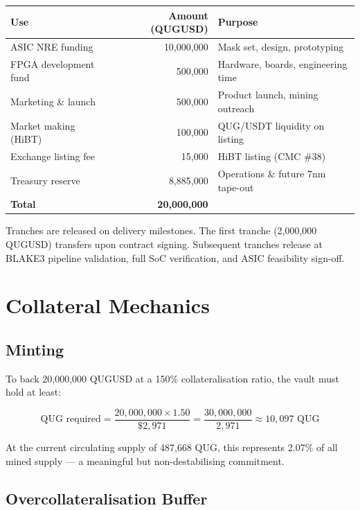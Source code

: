 \documentclass[11pt,a4paper]{article}
\begin{document}
\begin{center}
\begin{tabular}{lrl}
\toprule
\textbf{Use} & \textbf{Amount (QUGUSD)} & \textbf{Purpose} \\
\midrule
ASIC NRE funding          & 10,000,000  & Mask set, design, prototyping \\
FPGA development fund     &    500,000  & Hardware, boards, engineering time \\
Marketing \& launch       &    500,000  & Product launch, mining outreach \\
Market making (HiBT)      &    100,000  & QUG/USDT liquidity on listing \\
Exchange listing fee      &     15,000  & HiBT listing (CMC \#38) \\
Treasury reserve          &  8,885,000  & Operations \& future 7nm tape-out \\
\midrule
\textbf{Total}            & \textbf{20,000,000} & \\
\bottomrule
\end{tabular}
\end{center}

Tranches are released on delivery milestones. The first tranche (2,000,000 QUGUSD)
transfers upon contract signing. Subsequent tranches release at BLAKE3 pipeline
validation, full SoC verification, and ASIC feasibility sign-off.

\section{Collateral Mechanics}

\subsection{Minting}

To back 20,000,000 QUGUSD at a 150\% collateralisation ratio, the vault
must hold at least:

\[
  \text{QUG required} = \frac{20{,}000{,}000 \times 1.50}{\$2{,}971}
  = \frac{30{,}000{,}000}{2{,}971} \approx 10{,}097 \text{ QUG}
\]

At the current circulating supply of 487,668 QUG, this represents 2.07\%
of all mined supply — a meaningful but non-destabilising commitment.

\subsection{Overcollateralisation Buffer}
\end{document}
